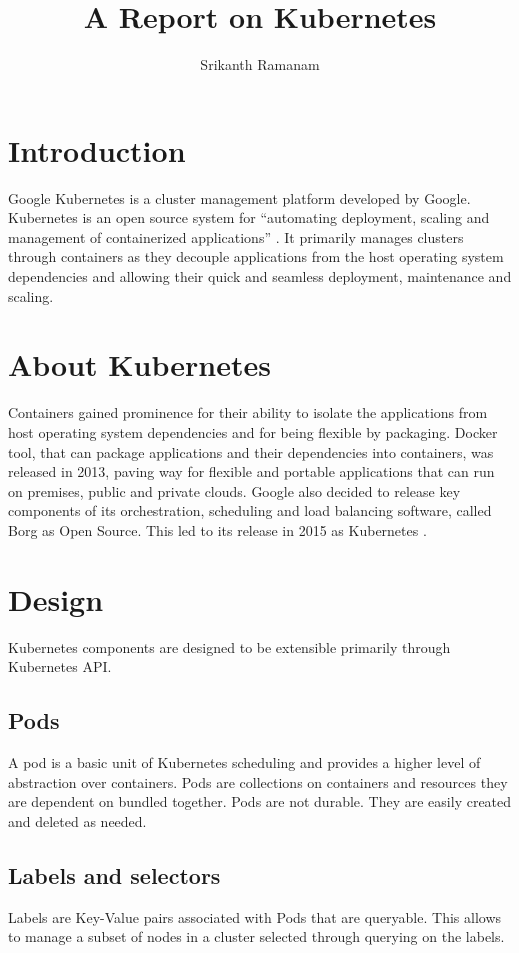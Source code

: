 \documentclass[9pt,twocolumn,twoside]{styles/osajnl}
\title{A Report on Kubernetes}
\author[1]{Srikanth Ramanam}
\affil[1]{School of Informatics and Computing, Bloomington, IN 47408, U.S.A.}
\affil[*]{Corresponding authors: srikrama@iu.edu}
\begin{document}
\maketitle

\section{Introduction}
Google Kubernetes is a cluster management platform developed by Google. Kubernetes is an open source system for “automating deployment, scaling and management of containerized applications” \cite{www-kubernetesdoc}. It primarily manages clusters through containers as they decouple applications from the host operating system dependencies and allowing their quick and seamless deployment, maintenance and scaling.




\section{About Kubernetes}

Containers gained prominence for their ability to isolate the applications from host operating system dependencies and for being flexible by packaging. Docker tool, that can package applications and their dependencies into containers, was released in 2013, paving way for flexible and portable applications that can run on premises, public and private clouds. Google also decided to release key components of its orchestration, scheduling and load balancing software, called Borg as Open Source. This led to its release in 2015 as Kubernetes \cite{www-kubernetesebook}.



\section{Design}
Kubernetes components are designed to be extensible primarily through Kubernetes API. 
\subsection{Pods}
A pod is a basic unit of Kubernetes scheduling and provides a higher level of abstraction over containers. Pods are collections on containers and resources they are dependent on bundled together. Pods are not durable. They are easily created and deleted as needed.
\subsection{Labels and selectors}
Labels are Key-Value pairs associated with Pods that are queryable. This allows to manage a subset of nodes in a cluster selected through querying on the labels.
\end{document}
